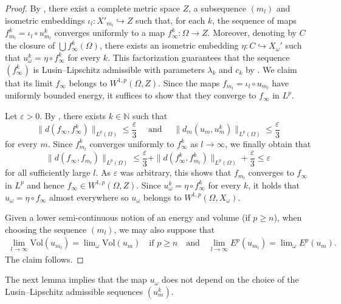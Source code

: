 \documentclass[a4paper,leqno]{amsart}
\numberwithin{equation}{section}
\theoremstyle{remark}
\theoremstyle{remark}
\newcommand{\N}{\mathbb{N}}
\begin{document}
\begin{proof}
By , there exist a complete metric space $Z$, a subsequence $(m_l)$ and isometric embeddings $\iota_l\colon X'_{m_l}\hookrightarrow Z$ such that, for each $k$, the sequence of maps $f_{m_l}^{k} = \iota_l\circ u_{m_l}^k$ converges uniformly to a map $f_\infty^k\colon \Omega\to Z$. Moreover, denoting by $C$ the closure of $\bigcup f_\infty^k(\Omega)$, there exists an isometric embedding $\eta\colon C\hookrightarrow X_\omega'$ such that $u_\omega^k = \eta\circ f_\infty^k$ for every $k$. This factorization guarantees that the sequence $(f^k_\infty)$ is Lusin--Lipschitz admissible with parameters $\lambda_k$ and $c_k$ by . We claim that its limit $f_\infty$ belongs to $W^{1,p}(\Omega, Z)$. Since the maps $f_{m_l} = \iota_l\circ u_{m_l}$ have uniformly bounded energy, it suffices to show that they converge to $f_\infty$ in $L^p$.

Let $\varepsilon>0$. By , there exists $k\in\N$ such that $$\|d(f_\infty, f_\infty^k)\|_{L^p(\Omega)}\leq \frac{\varepsilon}{3}\quad\text{ and }\quad\|d_m(u_m, u_m^k)\|_{L^p(\Omega)}\leq \frac{\varepsilon}{3}$$ for every $m$. Since $f_{m_l}^k$ converges uniformly to $f_\infty^k$ as $l\to\infty$, we finally obtain that $$\|d(f_\infty, f_{m_l})\|_{L^p(\Omega)}\leq \frac{\varepsilon}{3} + \|d(f_\infty^k, f_{m_l}^{k})\|_{L^p(\Omega)} + \frac{\varepsilon}{3}\leq \varepsilon$$ for all sufficiently large $l$. As $\varepsilon$ was arbitrary, this shows that $f_{m_l}$ converges to $f_\infty$ in $L^p$ and hence $f_\infty\in W^{1,p}(\Omega, Z)$.
Since $u_\omega^k = \eta \circ f_\infty^k$ for every $k$, it holds that $u_\omega = \eta \circ f_\infty$ almost everywhere so $u_\omega$ belongs to $W^{1,p}(\Omega, X_\omega)$.

Given a lower semi-continuous notion of an energy and volume (if $p \geq n$), when choosing the sequence $(m_l)$, we may also suppose that
\begin{align*}
    \lim_{l \to\infty} \mathrm{Vol}( u_{m_l} ) = \lim\nolimits_\omega \mathrm{Vol}( u_m ) \quad\text{if $p \geq n$}
    \quad\text{and}\quad
    \lim_{l\to\infty} E^{p}( u_{m_l} ) = \lim\nolimits_\omega E^{p}( u_{m} ).
\end{align*}
The claim follows.
\end{proof}



The next lemma implies that the map $u_\omega$ does not depend on the choice of the Lusin--Lipschitz admissible sequences $(u_m^k)$.
\end{document}
